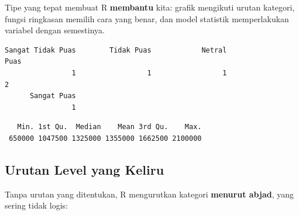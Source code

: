 \documentclass[
  indonesian,
  letterpaper,
]{book}
\newenvironment{Shaded}{\begin{snugshade}}{\end{snugshade}}
\newcommand{\CommentTok}[1]{\textcolor[rgb]{0.37,0.37,0.37}{#1}}
\newcommand{\FunctionTok}[1]{\textcolor[rgb]{0.28,0.35,0.67}{#1}}
\newcommand{\NormalTok}[1]{\textcolor[rgb]{0.00,0.23,0.31}{#1}}
\newcommand{\SpecialCharTok}[1]{\textcolor[rgb]{0.37,0.37,0.37}{#1}}
\begin{document}
Tipe yang tepat membuat R \textbf{membantu} kita: grafik mengikuti
urutan kategori, fungsi ringkasan memilih cara yang benar, dan model
statistik memperlakukan variabel dengan semestinya.

\begin{Shaded}
\end{Shaded}

\begin{verbatim}
Sangat Tidak Puas        Tidak Puas            Netral              Puas 
                1                 1                 1                 2 
      Sangat Puas 
                1 
\end{verbatim}

\begin{Shaded}
\end{Shaded}

\begin{verbatim}
   Min. 1st Qu.  Median    Mean 3rd Qu.    Max. 
 650000 1047500 1325000 1355000 1662500 2100000 
\end{verbatim}

\subsection{Urutan Level yang Keliru}\label{urutan-level-yang-keliru}

Tanpa urutan yang ditentukan, R mengurutkan kategori \textbf{menurut
abjad}, yang sering tidak logis:
\end{document}
